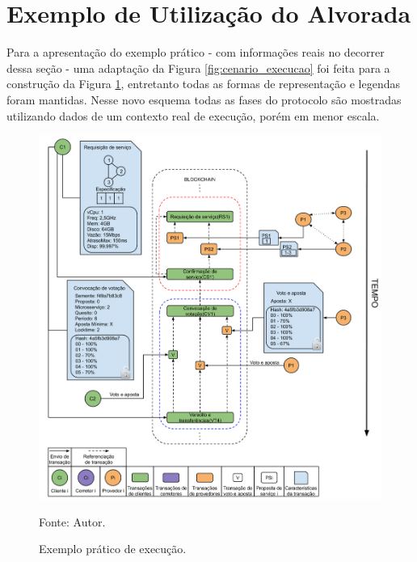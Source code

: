 
\section{Exemplo de Utilização do Alvorada}
\label{sec:proposta:exemplo}

Para a apresentação do exemplo prático - com informações reais no decorrer dessa seção - uma adaptação da Figura \ref{fig:cenario_execucao} foi feita para a construção da Figura \ref{fig:exemplo_execucao}, entretanto todas as formas de representação e legendas foram mantidas. Nesse novo esquema todas as fases do protocolo são mostradas utilizando dados de um contexto real de execução, porém em menor escala.

\begin{figure}[ht!]
\caption{Exemplo prático de execução.}
\centering
\includegraphics[width=1\textwidth]{imagens/exemplo_execucao.png}
\begin{center}
        Fonte: Autor.
\end{center}
\label{fig:exemplo_execucao}
\end{figure}

